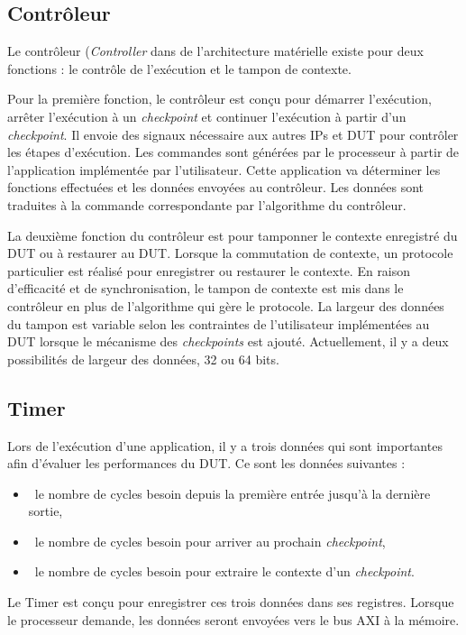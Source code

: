 \subsection{Contrôleur} %

Le contrôleur (\emph{Controller} dans de l'architecture matérielle existe pour deux fonctions : le contrôle
de l'exécution et le tampon de contexte.

Pour la première fonction, le contrôleur est conçu pour démarrer l'exécution, arrêter l'exécution à un
\emph{checkpoint} et continuer l'exécution à partir d'un \emph{checkpoint}. Il envoie des signaux nécessaire
aux autres IPs et DUT pour contrôler les étapes d'exécution.
Les commandes sont générées par le processeur à partir de l'application implémentée par l'utilisateur. Cette application va déterminer
les fonctions effectuées et les données envoyées au contrôleur. Les données sont traduites à la commande
correspondante par l'algorithme du contrôleur.

La deuxième fonction du contrôleur est pour tamponner le contexte enregistré du DUT ou à restaurer au DUT.
Lorsque la commutation de contexte, un protocole particulier est réalisé pour enregistrer ou restaurer le contexte.
En raison d'efficacité et de synchronisation, le tampon de contexte est mis dans le contrôleur en plus de l'algorithme
qui gère le protocole. La largeur des données du tampon est variable selon les contraintes de l'utilisateur implémentées au DUT
lorsque le mécanisme des \emph{checkpoints} est ajouté.
Actuellement, il y a deux possibilités de largeur des données, 32 ou 64 bits.

\subsection{Timer}

Lors de l'exécution d'une application, il y a trois données qui sont importantes afin d'évaluer les performances
du DUT. Ce sont les données suivantes :
\begin{itemize}
	\item\ le nombre de cycles besoin depuis la première entrée jusqu'à la dernière sortie,
	\item\ le nombre de cycles besoin pour arriver au prochain \emph{checkpoint},
	\item\ le nombre de cycles besoin pour extraire le contexte d'un \emph{checkpoint}.
\end{itemize}
Le Timer est conçu pour enregistrer ces trois données dans ses registres. Lorsque le processeur demande,
les données seront envoyées vers le bus AXI à la mémoire.

